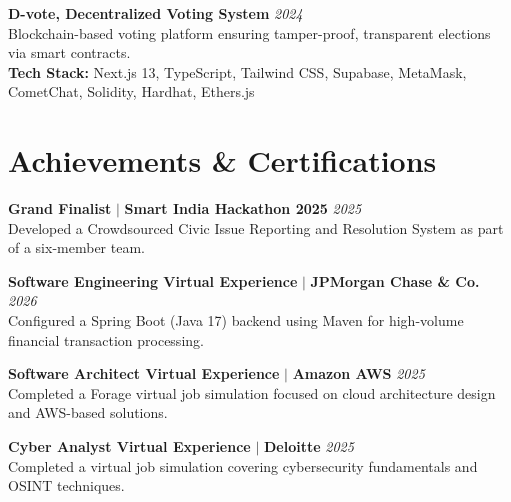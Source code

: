 \documentclass[10pt,a4paper]{article}
\begin{document}

\noindent\textbf{D-vote, Decentralized Voting System} \hfill \textit{2024}\\
Blockchain-based voting platform ensuring tamper-proof, transparent elections via smart contracts.\\
\textbf{Tech Stack:} Next.js 13, TypeScript, Tailwind CSS, Supabase, MetaMask, CometChat, Solidity, Hardhat, Ethers.js

\vspace{5pt}

\section*{Achievements \& Certifications}
\sectionrule
\noindent\textbf{Grand Finalist} $|$ \textbf{Smart India Hackathon 2025} \hfill \textit{2025}\\
Developed a Crowdsourced Civic Issue Reporting and Resolution System as part of a six-member team.

\vspace{4pt}
\noindent\textbf{Software Engineering Virtual Experience} $|$ \textbf{JPMorgan Chase \& Co.} \hfill \textit{2026}\\
Configured a Spring Boot (Java 17) backend using Maven for high-volume financial transaction processing.

\vspace{4pt}
\noindent\textbf{Software Architect Virtual Experience} $|$ \textbf{Amazon AWS} \hfill \textit{2025}\\
Completed a Forage virtual job simulation focused on cloud architecture design and AWS-based solutions.

\vspace{4pt}
\noindent\textbf{Cyber Analyst Virtual Experience} $|$ \textbf{Deloitte} \hfill \textit{2025}\\
Completed a virtual job simulation covering cybersecurity fundamentals and OSINT techniques.
\end{document}
